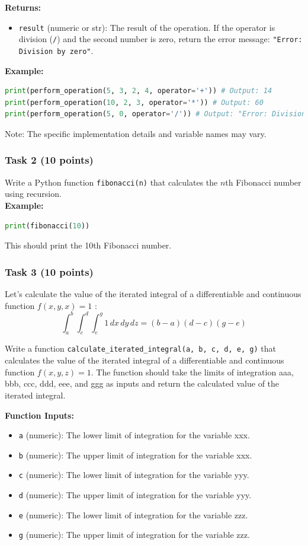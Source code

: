 \documentclass[12pt]{book}
\begin{document}
\textbf{Returns:}
\begin{itemize}
\item \texttt{result} (numeric or str): The result of the operation. If the operator is division (\texttt{/}) and the second number is zero, return the error message: \texttt{"Error: Division by zero"}.
\end{itemize}

\textbf{Example:}
\begin{lstlisting}[language=Python]
print(perform_operation(5, 3, 2, 4, operator='+')) # Output: 14
print(perform_operation(10, 2, 3, operator='*')) # Output: 60
print(perform_operation(5, 0, operator='/')) # Output: "Error: Division by zero"
\end{lstlisting}

Note: The specific implementation details and variable names may vary.

\subsubsection{Task 2 (10 points)}
Write a Python function \texttt{fibonacci(n)} that calculates the $n$th Fibonacci number using recursion. \\
\textbf{Example:}
\begin{lstlisting}[language=Python]
print(fibonacci(10))
\end{lstlisting}
This should print the 10th Fibonacci number.

\subsubsection{Task 3 (10 points)}

Let's calculate the value of the iterated integral of a differentiable and continuous function $f(x,y,x) = 1$ :
\[
\int_a^b \int_c^d \int_e^g 1 \, dx \, dy \, dz = (b - a)(d - c)(g - e)
\]

Write a function \texttt{calculate\_iterated\_integral(a, b, c, d, e, g)} that calculates the value of the iterated integral of a differentiable and continuous function $f(x,y,z)=1$. The function should take the limits of integration aaa, bbb, ccc, ddd, eee, and ggg as inputs and return the calculated value of the iterated integral.

\textbf{Function Inputs:}
\begin{itemize}
\item \texttt{a} (numeric): The lower limit of integration for the variable xxx.
\item \texttt{b} (numeric): The upper limit of integration for the variable xxx.
\item \texttt{c} (numeric): The lower limit of integration for the variable yyy.
\item \texttt{d} (numeric): The upper limit of integration for the variable yyy.
\item \texttt{e} (numeric): The lower limit of integration for the variable zzz.
\item \texttt{g} (numeric): The upper limit of integration for the variable zzz.
\end{itemize}
\end{document}
